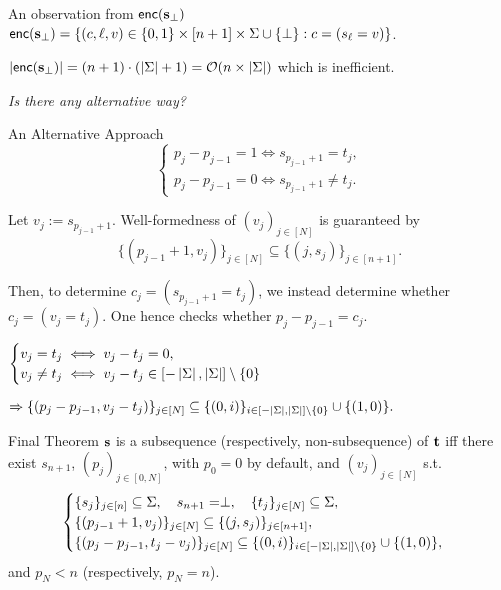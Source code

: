 \begin{frame}{An observation from $\mathsf{enc}(\mathbf{s}_\perp)$}
	$\mathsf{enc}(\mathbf{s}_\perp)  = \{(c, \ell, v) \in \{0,1\}\times[n+1]\times\Sigma\cup\{\perp\} : c = (s_\ell = v)\}$.
	
	$\left|\mathsf{enc}(\mathbf{s}_\perp)\right| = (n + 1)\cdot (\left|\Sigma\right| + 1) = \mathcal{O}(n \times \left|\Sigma\right|)$ which is inefficient.
	
	\pause
	\begin{center}
		\emph{Is there any alternative way?}
	\end{center}
\end{frame}

\begin{frame}{An Alternative Approach}
	\begin{equation*}
		\begin{cases}
			p_j - p_{j - 1} = 1 \iff s_{p_{j - 1} + 1} = t_j,\\ 
			p_j - p_{j - 1} = 0 \iff s_{p_{j - 1} + 1} \not= t_j.
		\end{cases}
	\end{equation*}
	
	Let $v_j := s_{p_{j - 1} + 1}$. Well-formedness of $(v_j)_{j \in [N]}$ is guaranteed by
	\begin{equation*}
		\{(p_{j - 1} + 1, v_j)\}_{j \in [N]} \subseteq \{(j, s_j)\}_{j \in [n + 1]}.
	\end{equation*}
	
	Then, to determine $ c_j = (s_{p_{j - 1} + 1} = t_j)$, we instead determine whether $c_j = (v_j = t_j)$. One hence checks whether $p_j - p_{j - 1} = c_j$.
	
	$
		\begin{cases}
			v_j = t_j \iff v_j - t_j = 0,\\ v_j\not=t_j\iff v_j - t_j \in [-\left|\Sigma\right|, \left|\Sigma\right|]\setminus\{0\}
		\end{cases}
	$ 
	
	$
		\Rightarrow \{(p_j - p_{j - 1}, v_j - t_j)\}_{j \in [N]} \subseteq \{(0, i)\}_{i \in [-\left|\Sigma\right|, \left|\Sigma\right|]\setminus\{0\}} \cup \{(1, 0)\}.
	$
\end{frame}

\begin{frame}{Final Theorem}
	$\mathbf{s}$ is a subsequence (respectively, non-subsequence) of $\mathbf{t}$  iff there exist $s_{n+1}$, $(p_j)_{j \in [0, N]}$, with $p_0=0$ by default,  and $(v_j)_{j \in [N]}$ s.t.
	\begin{equation*}%
		\begin{cases}
			\{s_j\}_{j \in [n]} \subseteq \Sigma,\quad s_{n+1} = \perp,\quad \{t_j\}_{j \in [N]} \subseteq \Sigma,\\
			\{(p_{j - 1} + 1, v_j)\}_{j \in [N]} \subseteq \{(j, s_j)\}_{j \in [n+1]},\\
			\{(p_j - p_{j - 1}, t_j - v_j)\}_{j \in [N]} \subseteq \{(0,i)\}_{i \in [-\size{\Sigma}, \size{\Sigma}]\setminus\{0\}} \cup \{(1, 0)\},
		\end{cases}
	\end{equation*}
	and $p_N < n$ (respectively, $p_N = n$).
\end{frame}